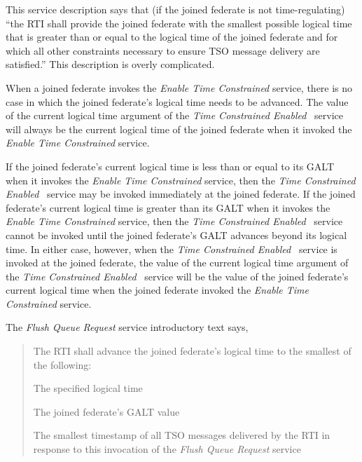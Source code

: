 \begin{annexstdpage}

    This service description says that (if the joined federate is not time-regulating) ``the RTI shall provide the joined federate with the smallest possible logical time that is greater than or equal to the logical time of the joined federate and for which all other constraints necessary to ensure TSO message delivery are satisfied.'' This description is overly complicated.

    When a joined federate invokes the \textit{Enable Time Constrained} service, there is no case in which the joined federate's logical time needs to be advanced. The value of the current logical time argument of the \textit{Time Constrained Enabled} \rtiinitiated\ service will always be the current logical time of the joined federate when it invoked the \textit{Enable Time Constrained} service.

    If the joined federate's current logical time is less than or equal to its GALT when it invokes the \textit{Enable Time Constrained} service, then the \textit{Time Constrained Enabled} \rtiinitiated\ service may be invoked immediately at the joined federate. If the joined federate's current logical time is greater than its GALT when it invokes the \textit{Enable Time Constrained} service, then the \textit{Time Constrained Enabled} \rtiinitiated\ service cannot be invoked until the joined federate's GALT advances beyond its logical time. In either case, however, when the \textit{Time Constrained Enabled} \rtiinitiated\ service is invoked at the joined federate, the value of the current logical time argument of the \textit{Time Constrained Enabled} \rtiinitiated\ service will be the value of the joined federate's current logical time when the joined federate invoked the \textit{Enable Time Constrained} service.


    The \textit{Flush Queue Request} service introductory text says,

    \begin{quote}
        The RTI shall advance the joined federate's logical time to the smallest of the following:
        \begin{stddashlist}
            \item The specified logical time
            \item The joined federate's GALT value
            \item The smallest timestamp of all TSO messages delivered by the RTI in response to this invocation of the \textit{Flush Queue Request} service
        \end{stddashlist}
    \end{quote}


\end{annexstdpage}
